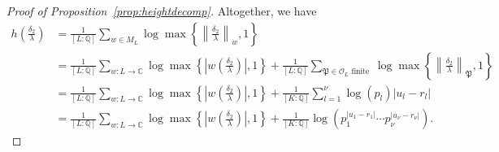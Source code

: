 \begin{proof}[Proof of Proposition~\ref{prop:heightdecomp}]
Altogether, we have
\begin{align*}
h\left(\frac{\delta_2}{\lambda}\right)
	& =\frac{1}{[L:\mathbb{Q}]}\sum_{w \in M_L} \log \max \left\{ \left\|\frac{\delta_2}{\lambda}\right\|_{w}, 1\right\}\\
	& = \frac{1}{[L:\mathbb{Q}]}\sum_{w :L \to \mathbb{C}} \log \max \left\{ \left|w\left(\frac{\delta_2}{\lambda}\right)\right|, 1\right\} + \frac{1}{[L:\mathbb{Q}]}\sum_{\mathfrak{P} \in \mathcal{O}_L \text{ finite }} \log \max \left\{ \left\|\frac{\delta_2}{\lambda}\right\|_{\mathfrak{P}}, 1\right\}\\
	& = \frac{1}{[L:\mathbb{Q}]}\sum_{w :L \to \mathbb{C}} \log \max \left\{ \left|w\left(\frac{\delta_2}{\lambda}\right)\right|, 1\right\} + \frac{1}{[K:\mathbb{Q}]}\sum_{l = 1}^{\nu} \log(p_l)|u_l - r_l|\\
	& = \frac{1}{[L:\mathbb{Q}]}\sum_{w :L \to \mathbb{C}} \log \max \left\{ \left|w\left(\frac{\delta_2}{\lambda}\right)\right|, 1\right\} + \frac{1}{[K:\mathbb{Q}]}\log\left(p_1^{|u_1 - r_1|} \cdots p_{\nu}^{|u_{\nu} - r_{\nu}|}\right).
\end{align*}


\end{proof}
